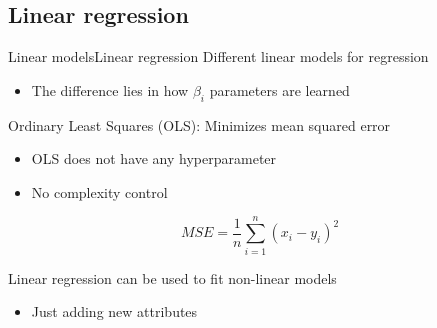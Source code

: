 \documentclass[10pt,compress]{beamer} %
\begin{document}
\subsection{Linear regression}
\begin{frame}{Linear models}{Linear regression}
    Different linear models for regression
    \begin{itemize}
        \item The difference lies in how $\beta_i$ parameters are learned
    \end{itemize}

	Ordinary Least Squares (OLS): Minimizes mean squared error
	\begin{itemize}
        \item OLS does not have any hyperparameter
        \item No complexity control
	\end{itemize}
    
    \begin{equation*}
    MSE = \frac{1}{n} \sum_{i=1}^n (x_i - y_i)^2
    \end{equation*}

    Linear regression can be used to fit non-linear models    
    \begin{itemize}
        \item Just adding new attributes
    \end{itemize}
\end{frame}
\end{document}

